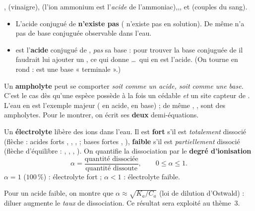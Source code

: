 \documentclass[11pt,a4paper]{article}
\begin{document}
\begin{exemplebox}
,\quad {} (vinaigre),\quad {} (l'ion ammonium est l'\emph{acide} de
l'ammoniac),\quad {},\quad {},\quad {} et  (couples du sang).
\end{exemplebox}

\begin{piege}
\begin{itemize}[leftmargin=1.5em,topsep=2pt,itemsep=1.5pt]
  \item L'acide conjugué de  \textbf{n'existe pas} ( n'existe pas en solution). De même
         n'a pas de base conjuguée observable dans l'eau.
  \item {} est l'\textbf{acide} conjugué de , \emph{pas} sa base : pour trouver la base
        conjuguée de  il faudrait lui ajouter un , ce qui donne \ldots\ qui en est
        l'acide. (On tourne en rond :  est une base « terminale ».)
\end{itemize}
\end{piege}

\begin{cle}
Un \textbf{ampholyte} peut se comporter \emph{soit comme un acide, soit comme une base}. C'est le cas dès qu'une
espèce possède à la fois un  cédable \emph{et} un site capteur de . L'eau en est l'exemple majeur
( en acide,  en base) ; de même , ,  sont des
ampholytes. Pour le montrer, on écrit ses \textbf{deux} demi-équations.
\end{cle}

\begin{cle}
Un \textbf{électrolyte} libère des ions dans l'eau. Il est \textbf{fort} s'il est \emph{totalement} dissocié
(flèche \ce{->} : acides forts , , ,  ; bases fortes , ),
\textbf{faible} s'il est \emph{partiellement} dissocié (flèche d'équilibre \ce{<=>} : , ,
, ). On quantifie la dissociation par le \textbf{degré d'ionisation}
\[ \boxed{\alpha = \dfrac{\text{quantité dissociée}}{\text{quantité dissoute}}},\qquad 0 \le \alpha \le 1. \]
$\alpha = 1$ ($100\,\%$) : électrolyte fort ; $\alpha < 1$ : électrolyte faible.
\end{cle}

\begin{remarque}
Pour un acide faible, on montre que $\alpha \approx \sqrt{K_a/C_a}$ (loi de dilution d'Ostwald) : diluer
augmente le \emph{taux} de dissociation. Ce résultat sera exploité au thème~3.
\end{remarque}
\end{document}

